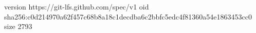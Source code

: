 version https://git-lfs.github.com/spec/v1
oid sha256:c0d214970a62f457c68b8a18c1decdba6c2bbfc5edc4f81360a54e1863453cc0
size 2793
